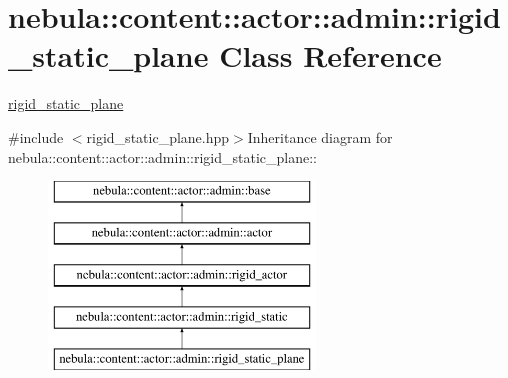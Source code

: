 \hypertarget{classnebula_1_1content_1_1actor_1_1admin_1_1rigid__static__plane}{
\section{nebula::content::actor::admin::rigid\_\-static\_\-plane Class Reference}
\label{classnebula_1_1content_1_1actor_1_1admin_1_1rigid__static__plane}
}


\hyperlink{classnebula_1_1content_1_1actor_1_1admin_1_1rigid__static__plane}{rigid\_\-static\_\-plane}  


{\ttfamily \#include $<$rigid\_\-static\_\-plane.hpp$>$}Inheritance diagram for nebula::content::actor::admin::rigid\_\-static\_\-plane::\begin{figure}[H]
\begin{center}
\leavevmode
\includegraphics[height=5cm]{classnebula_1_1content_1_1actor_1_1admin_1_1rigid__static__plane}
\end{center}
\end{figure}

